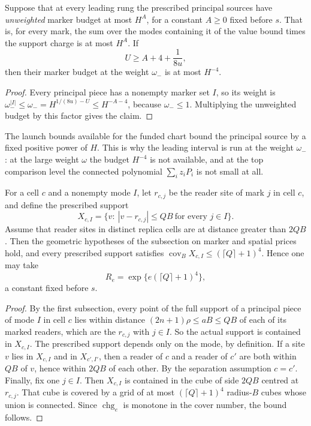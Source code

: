 \begin{lemma}
\label{lem:allarity-leading-budget}
Suppose that at every leading rung the prescribed principal sources have
\emph{unweighted} marker budget at most $H^{A}$, for a constant $A\ge0$
fixed before $s$. That is, for every mark, the sum over the modes
containing it of the value bound times the support charge is at most
$H^{A}$. If
\[
 U\ge A+4+\frac1{8u},
\]
then their marker budget at the weight $\omega_-$ is at most $H^{-4}$.
\end{lemma}
\begin{proof}
Every principal piece has a nonempty marker set $I$, so its weight is
$\omega_-^{|I|}\le\omega_-=H^{1/(8u)-U}\le H^{-A-4}$, because
$\omega_-\le1$. Multiplying the unweighted budget by this factor gives
the claim.
\end{proof}

The launch bounds available for the funded chart bound the principal
source by a fixed positive power of $H$. This is why the leading interval
is run at the weight $\omega_-$: at the large weight $\omega$ the budget
$H^{-4}$ is not available, and at the top comparison level the
connected polynomial $\sum_iz_iP_i$ is not small at all.

\begin{lemma}
\label{lem:allarity-step-charge}
For a cell $c$ and a nonempty mode $I$, let $r_{c,j}$ be the reader site
of mark $j$ in cell $c$, and define the prescribed support
\[
 X_{c,I}=\{v:\ |v-r_{c,j}|\le QB\ \text{for every } j\in I\}.
\]
Assume that reader sites in distinct replica cells are at distance
greater than $2QB$. Then the geometric hypotheses of the subsection on
marker and spatial prices hold, and every prescribed support satisfies
$\operatorname{cov}_BX_{c,I}\le(\lceil Q\rceil+1)^4$. Hence one may take
\[
 R_e=\exp\{e(\lceil Q\rceil+1)^4\},
\]
a constant fixed before $s$.
\end{lemma}
\begin{proof}
By the first subsection, every point of the full support of a principal
piece of mode $I$ in cell $c$ lies within distance
$(2n+1)\rho\le aB\le QB$ of each of its marked readers, which are the
$r_{c,j}$ with $j\in I$. So the actual support is contained in $X_{c,I}$.
The prescribed support depends only on the mode, by definition. If a site
$v$ lies in $X_{c,I}$ and in $X_{c',I'}$, then a reader of $c$ and a
reader of $c'$ are both within $QB$ of $v$, hence within $2QB$ of each
other. By the separation assumption $c=c'$. Finally, fix one $j\in I$.
Then $X_{c,I}$ is contained in the cube of side $2QB$ centred at
$r_{c,j}$. That cube is covered by a grid of at most
$(\lceil Q\rceil+1)^4$ radius-$B$ cubes whose union is connected. Since
$\operatorname{chg}_e$ is monotone in the cover number, the bound
follows.
\end{proof}


